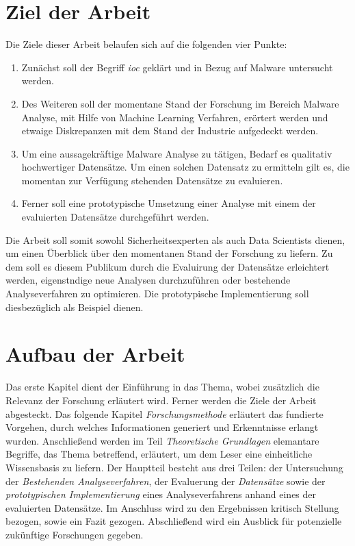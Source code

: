 \documentclass[
    12pt, %
    DIV10,
    ngerman, %
    a4paper, %
    oneside, %
    titlepage, %
    parskip=half, %
    headings=normal, %
    listof=totoc, %
    bibliography=totoc, %
    index=totoc, %
    captions=tableheading, %
    final %
]{scrreprt}
\begin{document}
\section{Ziel der Arbeit}
Die Ziele dieser Arbeit belaufen sich auf die folgenden vier Punkte:
\begin{enumerate}
\item Zunächst soll der Begriff \emph{\acl{ioc}} geklärt und in Bezug auf Malware untersucht werden. 
\item Des Weiteren soll der momentane Stand der Forschung im Bereich Malware Analyse, mit Hilfe von Machine Learning Verfahren, erörtert werden und etwaige Diskrepanzen mit dem Stand der Industrie aufgedeckt werden.
\item Um eine aussagekräftige Malware Analyse zu tätigen, Bedarf es qualitativ hochwertiger Datensätze. Um einen solchen Datensatz zu ermitteln gilt es, die momentan zur Verfügung stehenden Datensätze zu evaluieren.
\item Ferner soll eine prototypische Umsetzung einer Analyse mit einem der evaluierten Datensätze durchgeführt werden.
\end{enumerate}
Die Arbeit soll somit sowohl Sicherheitsexperten als auch Data Scientists dienen, um einen Überblick über den momentanen Stand der Forschung zu liefern. Zu dem soll es diesem Publikum durch die Evaluirung der Datensätze erleichtert werden, eigenstndige neue Analysen durchzuführen oder bestehende Analyseverfahren zu optimieren. Die prototypische Implementierung soll diesbezüglich als Beispiel dienen.
\section{Aufbau der Arbeit}
Das erste Kapitel dient der Einführung in das Thema, wobei zusätzlich die Relevanz der Forschung erläutert wird. Ferner werden die Ziele der Arbeit abgesteckt. Das folgende Kapitel \emph{Forschungsmethode} erläutert das fundierte Vorgehen, durch welches Informationen generiert und Erkenntnisse erlangt wurden. Anschließend werden im Teil \emph{Theoretische Grundlagen} elemantare Begriffe, das Thema betreffend, erläutert, um dem Leser eine einheitliche Wissensbasis zu liefern. Der Hauptteil besteht aus drei Teilen: der Untersuchung der \emph{Bestehenden Analyseverfahren}, der Evaluerung der \emph{Datensätze} sowie der \emph{prototypischen Implementierung} eines Analyseverfahrens anhand eines der evaluierten Datensätze. Im Anschluss wird zu den  Ergebnissen kritisch Stellung bezogen, sowie ein Fazit gezogen. Abschließend wird ein Ausblick für potenzielle zukünftige Forschungen gegeben.
\end{document}
